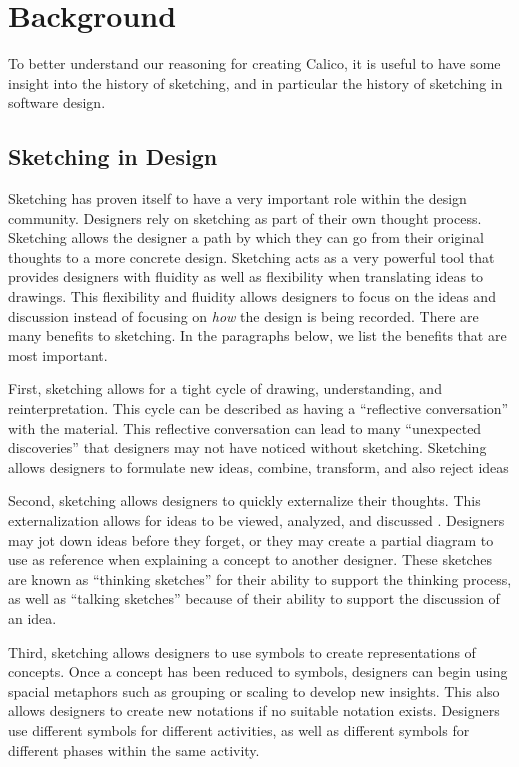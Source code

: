 \chapter{Background}

To better understand our reasoning for creating Calico, it is useful to have some insight into the history of sketching, and in particular the history of sketching in software design. 

\section{Sketching in Design}

Sketching has proven itself to have a very important role within the design community. 
Designers rely on sketching as part of their own thought process\cite{petre}. Sketching allows the designer a path by which they can go from their original thoughts to a more concrete design. Sketching acts as a very powerful tool that provides designers with fluidity as well as flexibility when translating ideas to drawings\cite{csik}. This flexibility and fluidity allows designers to focus on the ideas and discussion instead of focusing on \emph{how} the design is being recorded. There are many benefits to sketching. In the paragraphs below, we list the benefits that are most important.

First, sketching allows for a tight cycle of drawing, understanding, and reinterpretation. This cycle can be described as having a ``reflective conversation'' with the material\cite{schon}. This reflective conversation can lead to many ``unexpected discoveries'' \cite{suwa} that designers may not have noticed without sketching. Sketching allows designers to formulate new ideas, combine, transform, and also reject ideas

Second, sketching allows designers to quickly externalize their thoughts. This externalization allows for ideas to be viewed, analyzed, and discussed \cite{petre}. Designers may jot down ideas before they forget, or they may create a partial diagram to use as reference when explaining a concept to another designer. These sketches are known as ``thinking sketches'' for their ability to support the thinking process, as well as ``talking sketches'' because of their ability to support the discussion of an idea\cite{ferguson}. 

Third, sketching allows designers to use symbols to create representations of concepts. Once a concept has been reduced to symbols, designers can begin using spacial metaphors such as grouping or scaling to develop new insights\cite{larkin}. This also allows designers to create new notations if no suitable notation exists. Designers use different symbols for different activities, as well as different symbols for different phases within the same activity\cite{goel}. 


